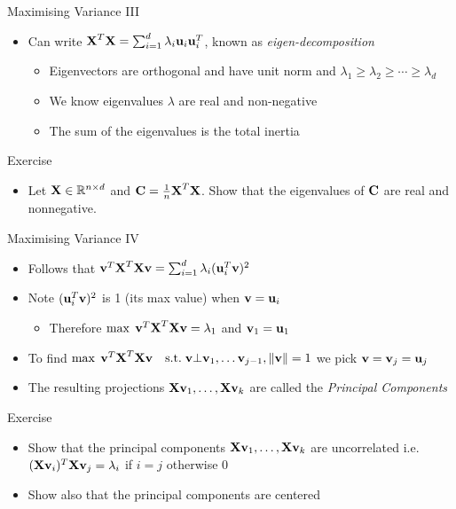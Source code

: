 \documentclass{beamer}
\begin{document}
\begin{frame}{Maximising Variance III}  
\begin{itemize} 
 \item Can write $\textbf{X}^T\textbf{X} = \sum_{i=1}^d \lambda_i \textbf{u}_i \textbf{u}_i^T$, known as \emph{eigen-decomposition}
  \begin{itemize} 
  \item Eigenvectors are orthogonal and have unit norm and $\lambda_1 \geq \lambda_2 \geq \cdots \geq \lambda_d$ 
  \item We know eigenvalues $\lambda$ are real and non-negative 
  \item The sum of the eigenvalues is the total inertia 
  \end{itemize} 
\end{itemize}
\end{frame}

\begin{frame}{Exercise}
\begin{itemize} 
 \item Let $\textbf{X} \in \mathbb{R}^{n \times d}$ and $\textbf{C} = \frac{1}{n} \textbf{X}^T\textbf{X}$. Show that the eigenvalues of $\textbf{C}$ are real and nonnegative. 
\end{itemize}
\end{frame}


\begin{frame}{Maximising Variance IV}  
\begin{itemize}
\item Follows that $\textbf{v}^T\textbf{X}^T\textbf{X}\textbf{v} = \sum_{i=1}^d \lambda_i (\textbf{u}_i^T\textbf{v})^2$
\item Note $(\textbf{u}_i^T\textbf{v})^2$ is 1 (its max value) when $\textbf{v} = \textbf{u}_i$
\begin{itemize}
\item Therefore $\max \; \textbf{v}^T\textbf{X}^T\textbf{X}\textbf{v} = \lambda_1$ and $\textbf{v}_1 = \textbf{u}_1$
\end{itemize}
\item To find $\max \; \textbf{v}^T\textbf{X}^T\textbf{X}\textbf{v} \quad \mbox{s.t.} \;  \textbf{v} \bot \textbf{v}_1, \ldots \textbf{v}_{j-1}, \|\textbf{v} \|  = 1$ we pick $\textbf{v} = \textbf{v}_{j} = \textbf{u}_{j}$
\item The resulting projections $\textbf{X}\textbf{v}_1, \ldots, \textbf{X}\textbf{v}_k$ are called the \emph{Principal Components} 
\end{itemize}
\end{frame}

\begin{frame}{Exercise}  
\begin{itemize} 
 \item Show that the principal components $\textbf{X}\textbf{v}_1, \ldots, \textbf{X}\textbf{v}_k$ are uncorrelated i.e. $(\textbf{X}\textbf{v}_i)^T\textbf{X}\textbf{v}_j = \lambda_i $ if $i=j$ otherwise $0$ 
 \item Show also that the principal components are centered 
\end{itemize}
\end{frame}
\end{document}
